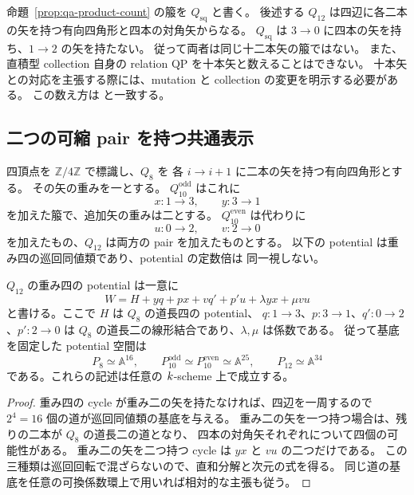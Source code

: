 \begin{remark}[十二本という数だけでは箙を指定できない]
\label{rem:qa-two-twelve-quivers}
命題~\ref{prop:qa-product-count} の箙を $Q_{\mathrm{sq}}$ と書く。
後述する $Q_{12}$ は四辺に各二本の矢を持つ有向四角形と四本の対角矢からなる。
$Q_{\mathrm{sq}}$ は $3\to0$ に四本の矢を持ち、$1\to2$ の矢を持たない。
従って両者は同じ十二本矢の箙ではない。
また、直積型 collection 自身の relation QP を十本矢と数えることはできない。
十本矢との対応を主張する際には、mutation と collection の変更を明示する必要がある。
この数え方は \cite[Remark 38.2]{AvatarVSeven2026} と一致する。
\end{remark}

\subsection{二つの可縮 pair を持つ共通表示}

四頂点を $\mathbb Z/4\mathbb Z$ で標識し、$Q_8$ を
各 $i\to i+1$ に二本の矢を持つ有向四角形とする。
その矢の重みを一とする。
$Q_{10}^{\mathrm{odd}}$ はこれに
\[
 x:1\longrightarrow3,\qquad y:3\longrightarrow1
\]
を加えた箙で、追加矢の重みは二とする。
$Q_{10}^{\mathrm{even}}$ は代わりに
\[
 u:0\longrightarrow2,\qquad v:2\longrightarrow0
\]
を加えたもの、$Q_{12}$ は両方の pair を加えたものとする。
以下の potential は重み四の巡回同値類であり、potential の定数倍は
同一視しない。

\begin{lemma}[共通 potential の形]
\label{lem:qa-universal-potential}
$Q_{12}$ の重み四の potential は一意に
\begin{equation}
\label{eq:qa-universal-potential}
 W=H+yq+px+vq'+p'u+\lambda yx+\mu vu
\end{equation}
と書ける。ここで $H$ は $Q_8$ の道長四の potential、
$q:1\to3$、$p:3\to1$、$q':0\to2$、$p':2\to0$ は
$Q_8$ の道長二の線形結合であり、$\lambda,\mu$ は係数である。
従って基底を固定した potential 空間は
\[
 P_8\simeq\mathbb A^{16},\qquad
 P_{10}^{\mathrm{odd}}\simeq P_{10}^{\mathrm{even}}\simeq\mathbb A^{25},
 \qquad P_{12}\simeq\mathbb A^{34}
\]
である。これらの記述は任意の $k$-scheme 上で成立する。
\end{lemma}

\begin{proof}
重み四の cycle が重み二の矢を持たなければ、四辺を一周するので
$2^4=16$ 個の道が巡回同値類の基底を与える。
重み二の矢を一つ持つ場合は、残りの二本が $Q_8$ の道長二の道となり、
四本の対角矢それぞれについて四個の可能性がある。
重み二の矢を二つ持つ cycle は $yx$ と $vu$ の二つだけである。
この三種類は巡回回転で混ざらないので、直和分解と次元の式を得る。
同じ道の基底を任意の可換係数環上で用いれば相対的な主張も従う。
\end{proof}

